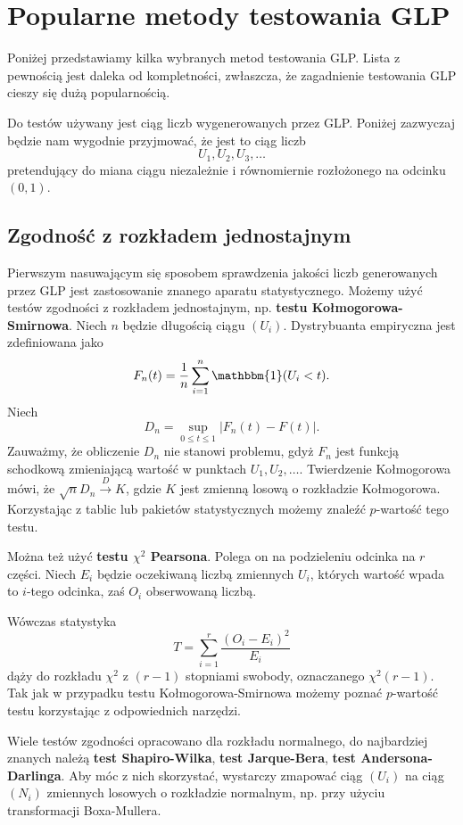 \documentclass[a4paper,11pt,twoside]{book}
\newcommand{\Conv}{\longrightarrow}
\theoremstyle{definition}
\begin{document}
\section{Popularne metody testowania GLP}
\label{sec:pop_testy}

Poniżej przedstawiamy kilka wybranych metod testowania GLP. Lista z pewnością jest daleka od kompletności, zwłaszcza, że zagadnienie testowania GLP cieszy się dużą popularnością.

Do testów używany jest ciąg liczb wygenerowanych przez GLP. Poniżej zazwyczaj będzie nam wygodnie przyjmować, że jest to ciąg liczb
\[ U_1, U_2, U_3, \ldots \]
pretendujący do miana ciągu niezależnie i równomiernie rozłożonego na odcinku $(0,1)$.

\subsection*{Zgodność z rozkładem jednostajnym}
Pierwszym nasuwającym się sposobem sprawdzenia jakości liczb generowanych przez GLP jest zastosowanie znanego aparatu statystycznego. Możemy użyć testów zgodności z rozkładem jednostajnym, np. \textbf{testu Kołmogorowa-Smirnowa}. Niech $n$ będzie długością ciągu $(U_i)$. Dystrybuanta empiryczna jest zdefiniowana jako
\[ F_n(t) = \frac{1}{n} \sum_{i=1}^n \mathbbm{1}(U_i < t). \]
Niech
\[ D_n = \sup_{0 \leq t \leq 1} |F_n(t) - F(t)|. \]
Zauważmy, że obliczenie $D_n$ nie stanowi problemu, gdyż $F_n$ jest funkcją schodkową zmieniającą wartość w punktach $U_1, U_2,\ldots$. Twierdzenie Kołmogorowa mówi, że $\sqrt{n} D_n \stackrel{D}{\Conv} K$, gdzie $K$ jest zmienną losową o rozkładzie Kołmogorowa. Korzystając z tablic lub pakietów statystycznych możemy znaleźć $p$-wartość tego testu.

Można też użyć \textbf{testu $\chi^2$ Pearsona}. Polega on na podzieleniu odcinka na $r$ części. Niech $E_i$ będzie oczekiwaną liczbą zmiennych $U_i$, których wartość wpada to $i$-tego odcinka, zaś $O_i$ obserwowaną liczbą.

Wówczas statystyka
\begin{equation}
 \label{eq:chisq}
 T = \sum_{i=1}^r \frac{(O_i - E_i)^2}{E_i} 
\end{equation}
dąży do rozkładu $\chi^2$ z $(r-1)$ stopniami swobody, oznaczanego $\chi^2(r-1)$. Tak jak w przypadku testu Kołmogorowa-Smirnowa możemy poznać $p$-wartość testu korzystając z odpowiednich narzędzi.

Wiele testów zgodności opracowano dla rozkładu normalnego, do najbardziej znanych należą \textbf{test Shapiro-Wilka}, \textbf{test Jarque-Bera}, \textbf{test Andersona-Darlinga}. Aby móc z nich skorzystać, wystarczy zmapować ciąg $(U_i)$ na ciąg $(N_i)$ zmiennych losowych o rozkładzie normalnym, np. przy użyciu transformacji Boxa-Mullera.
\end{document}
